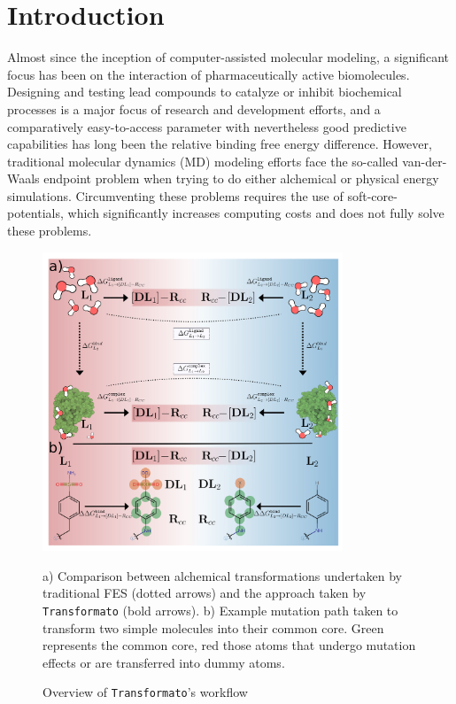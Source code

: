 \documentclass[oneside]{scrreprt}
\begin{document}
\begingroup
\let\clearpage\relax
\renewcommand\contentsname{Table of Contents}
\tableofcontents
{}
\endgroup
\renewcommand{\thefootnote}{\Roman{footnote}}
\chapter{Introduction}
Almost since the inception of computer-assisted molecular modeling, a significant focus has been on the interaction of pharmaceutically active biomolecules. Designing and testing lead compounds to catalyze or inhibit biochemical processes is a major focus of research and development efforts, and a comparatively easy-to-access parameter with nevertheless good predictive capabilities has long been the relative binding free energy difference. However, traditional molecular dynamics (MD) modeling efforts face the so-called van-der-Waals endpoint problem when trying to do either alchemical or physical energy simulations. Circumventing these problems requires the use of soft-core-potentials, which significantly increases computing costs and does not fully solve these problems. 

\begin{figure}
    \begin{center}
        
    
    \includegraphics[width=0.8\textwidth]{FESvsTrafo.png}
    \end{center}
    \caption{Overview of \texttt{Transformato}'s workflow}
    a) Comparison between alchemical transformations undertaken by traditional FES (dotted arrows) and the approach taken by \texttt{Transformato} (bold arrows). b) Example mutation path taken to transform two simple molecules into their common core. Green represents the common core, red those atoms that undergo mutation effects or are transferred into dummy atoms.
    \label{fig:fesvstrafo}
\end{figure}
\end{document}
